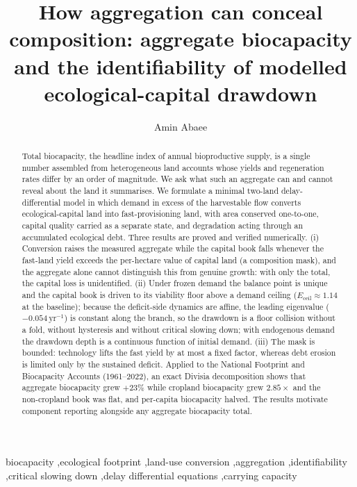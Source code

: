 \documentclass[preprint,12pt,authoryear]{elsarticle}
\newcommand{\Eceil}{E_{\mathrm{ceil}}}
\begin{document}
\begin{frontmatter}

\title{How aggregation can conceal composition: aggregate biocapacity and the identifiability of modelled ecological-capital drawdown}

\author[1]{Amin Abaee}

\begin{abstract}
Total biocapacity, the headline index of annual bioproductive supply, is a single number assembled from heterogeneous land accounts whose yields and regeneration rates differ by an order of magnitude. We ask what such an aggregate can and cannot reveal about the land it summarises. We formulate a minimal two-land delay-differential model in which demand in excess of the harvestable flow converts ecological-capital land into fast-provisioning land, with area conserved one-to-one, capital quality carried as a separate state, and degradation acting through an accumulated ecological debt. Three results are proved and verified numerically. (i) Conversion raises the measured aggregate while the capital book falls whenever the fast-land yield exceeds the per-hectare value of capital land (a composition mask), and the aggregate alone cannot distinguish this from genuine growth: with only the total, the capital loss is unidentified. (ii) Under frozen demand the balance point is unique and the capital book is driven to its viability floor above a demand ceiling ($\Eceil\approx1.14$ at the baseline); because the deficit-side dynamics are affine, the leading eigenvalue ($-0.054\,\mathrm{yr}^{-1}$) is constant along the branch, so the drawdown is a floor collision without a fold, without hysteresis and without critical slowing down; with endogenous demand the drawdown depth is a continuous function of initial demand. (iii) The mask is bounded: technology lifts the fast yield by at most a fixed factor, whereas debt erosion is limited only by the sustained deficit. Applied to the National Footprint and Biocapacity Accounts (1961--2022), an exact Divisia decomposition shows that aggregate biocapacity grew $+23\%$ while cropland biocapacity grew $2.85\times$ and the non-cropland book was flat, and per-capita biocapacity halved. The results motivate component reporting alongside any aggregate biocapacity total.
\end{abstract}

\begin{keyword}
biocapacity \sep ecological footprint \sep land-use conversion \sep aggregation \sep identifiability \sep critical slowing down \sep delay differential equations \sep carrying capacity
\end{keyword}

\end{frontmatter}
\end{document}
